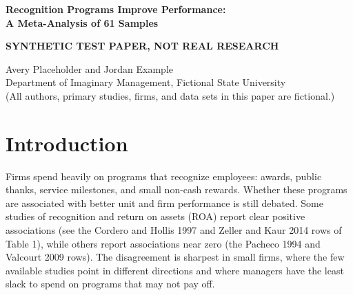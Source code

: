 \documentclass[11pt]{article}
\begin{document}
\begin{center}
{\Large\bfseries Recognition Programs Improve Performance:\\ A Meta-Analysis of 61 Samples\par}
\vspace{0.8em}
{\bfseries SYNTHETIC TEST PAPER, NOT REAL RESEARCH\par}
\vspace{0.8em}
Avery Placeholder and Jordan Example\\
Department of Imaginary Management, Fictional State University\\
{\small (All authors, primary studies, firms, and data sets in this paper are fictional.)}
\end{center}

\begin{abstract}
\noindent Prior studies disagree about whether workplace recognition programs pay off, and the disagreement is sharpest in small firms. We meta-analyze 180 effect sizes from 61 samples (N = 45,960) and find that recognition programs improve unit and firm performance (corrected rho = .12). The effect is consistently positive across settings, which resolves the inconsistency in prior findings. Our second main finding is that the effect holds even in small firms. A meta-analytic structural equation model traces the effect through employee engagement, voluntary turnover, and customer satisfaction. Moderator analyses identify two boundary conditions that lie in program design: manager training and public delivery.

\medskip
\noindent\textit{Keywords:} employee recognition, firm performance, meta-analysis, MASEM
\end{abstract}

\section{Introduction}

Firms spend heavily on programs that recognize employees: awards, public thanks, service milestones, and small non-cash rewards. Whether these programs are associated with better unit and firm performance is still debated. Some studies of recognition and return on assets (ROA) report clear positive associations (see the Cordero and Hollis 1997 and Zeller and Kaur 2014 rows of Table 1), while others report associations near zero (the Pacheco 1994 and Valcourt 2009 rows). The disagreement is sharpest in small firms, where the few available studies point in different directions and where managers have the least slack to spend on programs that may not pay off.
\end{document}

